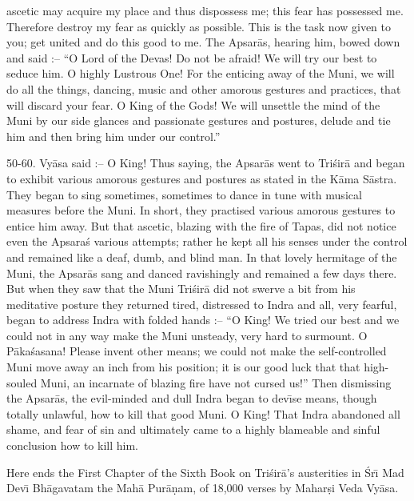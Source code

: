 ascetic may acquire my place and thus dispossess me; this fear has possessed me. Therefore destroy my fear as quickly as possible. This is the task now given to you; get united and do this good to me. The Apsar\=as, hearing him, bowed down and said :-- ``O Lord of the Devas! Do not be afraid! We will try our best to seduce him. O highly Lustrous One! For the enticing away of the Muni, we will do all the things, dancing, music and other amorous gestures and practices, that will discard your fear. O King of the Gods! We will unsettle the mind of the Muni by our side glances and passionate gestures and postures, delude and tie him and then bring him under our control.''

50-60. Vy\=asa said :-- O King! Thus saying, the Apsar\=as went to Tri\'sir\=a and began to exhibit various amorous gestures and postures as stated in the K\=ama S\=astra. They began to sing sometimes, sometimes to dance in tune with musical measures before the Muni. In short, they practised various amorous gestures to entice him away. But that ascetic, blazing with the fire of Tapas, did not notice even the Apsara\'s various attempts; rather he kept all his senses under the control and remained like a deaf, dumb, and blind man. In that lovely hermitage of the Muni, the Apsar\=as sang and danced ravishingly and remained a few days there. But when they saw that the Muni Tri\'sir\=a did not swerve a bit from his meditative posture they returned tired, distressed to Indra and all, very fearful, began to address Indra with folded hands :-- ``O King! We tried our best and we could not in any way make the Muni unsteady, very hard to surmount. O P\=aka\'sasana! Please invent other means; we could not make the self-controlled Muni move away an inch from his position; it is our good luck that that high-souled Muni, an incarnate of blazing fire have not cursed us!'' Then dismissing the Apsar\=as, the evil-minded and dull Indra began to dev\={\i}se means, though totally unlawful, how to kill that good Muni. O King! That Indra abandoned all shame, and fear of sin and ultimately came to a highly blameable and sinful conclusion how to kill him.

Here ends the First Chapter of the Sixth Book on Tri\'sir\=a's austerities in \'Sr\={\i} Mad Dev\={\i} Bh\=agavatam the Mah\=a Pur\=a\d{n}am, of 18,000 verses by Mahar\d{s}i Veda Vy\=asa.



